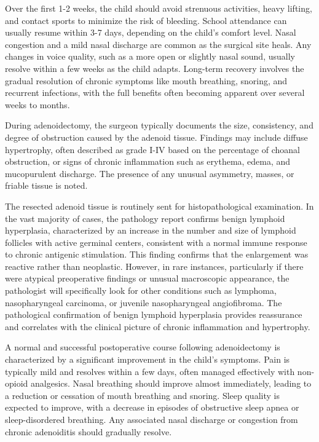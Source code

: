 Over the first 1-2 weeks, the child should avoid strenuous activities, heavy lifting, and contact sports to minimize the risk of bleeding. School attendance can usually resume within 3-7 days, depending on the child's comfort level. Nasal congestion and a mild nasal discharge are common as the surgical site heals. Any changes in voice quality, such as a more open or slightly nasal sound, usually resolve within a few weeks as the child adapts. Long-term recovery involves the gradual resolution of chronic symptoms like mouth breathing, snoring, and recurrent infections, with the full benefits often becoming apparent over several weeks to months.

During adenoidectomy, the surgeon typically documents the size, consistency, and degree of obstruction caused by the adenoid tissue. Findings may include diffuse hypertrophy, often described as grade I-IV based on the percentage of choanal obstruction, or signs of chronic inflammation such as erythema, edema, and mucopurulent discharge. The presence of any unusual asymmetry, masses, or friable tissue is noted.

The resected adenoid tissue is routinely sent for histopathological examination. In the vast majority of cases, the pathology report confirms benign lymphoid hyperplasia, characterized by an increase in the number and size of lymphoid follicles with active germinal centers, consistent with a normal immune response to chronic antigenic stimulation. This finding confirms that the enlargement was reactive rather than neoplastic. However, in rare instances, particularly if there were atypical preoperative findings or unusual macroscopic appearance, the pathologist will specifically look for other conditions such as lymphoma, nasopharyngeal carcinoma, or juvenile nasopharyngeal angiofibroma. The pathological confirmation of benign lymphoid hyperplasia provides reassurance and correlates with the clinical picture of chronic inflammation and hypertrophy.

A normal and successful postoperative course following adenoidectomy is characterized by a significant improvement in the child's symptoms. Pain is typically mild and resolves within a few days, often managed effectively with non-opioid analgesics. Nasal breathing should improve almost immediately, leading to a reduction or cessation of mouth breathing and snoring. Sleep quality is expected to improve, with a decrease in episodes of obstructive sleep apnea or sleep-disordered breathing. Any associated nasal discharge or congestion from chronic adenoiditis should gradually resolve.

